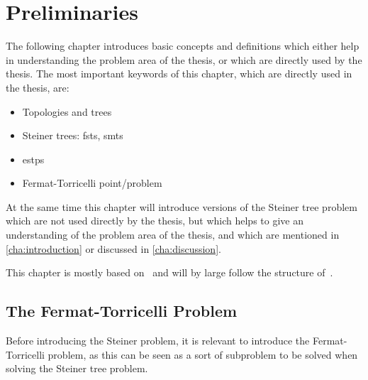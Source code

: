 {
\abnormalparskip{0pt}
\chapter{Preliminaries}
\label{cha:preliminaries}
}

The following chapter introduces basic concepts and definitions which either
help in understanding the problem area of the thesis, or which are directly used
by the thesis. The most important keywords of this chapter, which are directly
used in the thesis, are:
%
\begin{itemize}
\item Topologies and trees
\item Steiner trees: \aclp{fst}, \aclp{smt}
\item \aclp{estp}
\item Fermat-Torricelli point/problem
\end{itemize}
%
At the same time this chapter will introduce versions of the Steiner tree
problem which are not used directly by the thesis, but which helps to give an
understanding of the problem area of the thesis, and which are mentioned in
\cref{cha:introduction} or discussed in \cref{cha:discussion}.

This chapter is mostly based on~\textcite{smith1992,gilbert1968,brazil2015} and
will by large follow the structure of~\cite[ch.~1]{brazil2015}.

\section{The Fermat-Torricelli Problem}
\label{sec:ferm-torr-probl}

Before introducing the Steiner problem, it is relevant to introduce the
Fermat-Torricelli problem, as this can be seen as a sort of subproblem to be
solved when solving the Steiner tree problem.

